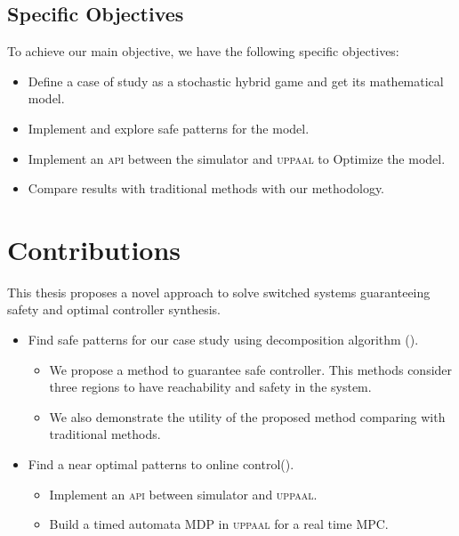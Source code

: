         \subsection*{Specific Objectives}
        To achieve our main objective, we have the following specific objectives:
        \begin{itemize}
            \item Define a case of study as a stochastic hybrid game and get its mathematical model.
            \item Implement and explore safe patterns for the model.
            \item Implement an \textsc{api} between the simulator and \textsc{uppaal} to Optimize the model.
            \item Compare results with traditional methods with our methodology.
        \end{itemize}


    \section{Contributions}
    \label{sec:contributions}
        This thesis proposes a novel approach to solve 
        switched systems guaranteeing safety and optimal
        controller synthesis. 
        \begin{itemize}
            \item Find safe patterns for our case study using
            decomposition algorithm (\cite{le2017improved}).
                \begin{itemize}
                    \item We propose a method to guarantee safe controller. This methods consider three regions to have reachability and safety in the system.
                    \item We also demonstrate the utility of the proposed method comparing with traditional methods.
                \end{itemize}
            \item Find a near optimal patterns to online control(\cite{larsen2016online}).
            \begin{itemize}
                \item Implement an \textsc{api} between simulator and \textsc{uppaal}.
                \item Build a timed automata \ac{MDP} in \textsc{uppaal} for a real time \ac{MPC}.
            \end{itemize}
        \end{itemize}

